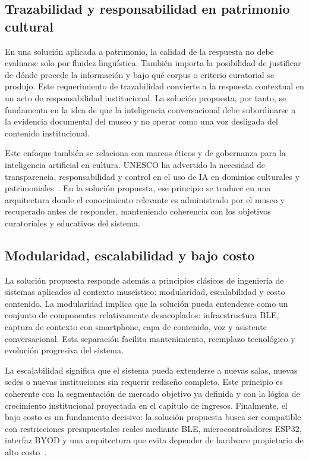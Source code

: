 \subsection{Trazabilidad y responsabilidad en patrimonio cultural}

En una soluci\'on aplicada a patrimonio, la calidad de la respuesta no debe evaluarse solo por fluidez ling\"u\'istica. Tambi\'en importa la posibilidad de justificar de d\'onde procede la informaci\'on y bajo qu\'e corpus o criterio curatorial se produjo. Este requerimiento de trazabilidad convierte a la respuesta contextual en un acto de responsabilidad institucional. La solución propuesta, por tanto, se fundamenta en la idea de que la inteligencia conversacional debe subordinarse a la evidencia documental del museo y no operar como una voz desligada del contenido institucional.

Este enfoque tambi\'en se relaciona con marcos \'eticos y de gobernanza para la inteligencia artificial en cultura. UNESCO ha advertido la necesidad de transparencia, responsabilidad y control en el uso de IA en dominios culturales y patrimoniales~\cite{unescoaiculture2025}. En la solución propuesta, ese principio se traduce en una arquitectura donde el conocimiento relevante es administrado por el museo y recuperado antes de responder, manteniendo coherencia con los objetivos curatoriales y educativos del sistema.

\subsection{Modularidad, escalabilidad y bajo costo}

La solución propuesta responde adem\'as a principios cl\'asicos de ingenier\'ia de sistemas aplicados al contexto muse\'istico: modularidad, escalabilidad y costo contenido. La modularidad implica que la soluci\'on pueda entenderse como un conjunto de componentes relativamente desacoplados: infraestructura BLE, captura de contexto con smartphone, capa de contenido, voz y asistente conversacional. Esta separaci\'on facilita mantenimiento, reemplazo tecnol\'ogico y evoluci\'on progresiva del sistema.

La escalabilidad significa que el sistema pueda extenderse a nuevas salas, nuevas sedes o nuevas instituciones sin requerir redise\~no completo. Este principio es coherente con la segmentaci\'on de mercado objetivo ya definida y con la l\'ogica de crecimiento institucional proyectada en el cap\'itulo de ingresos. Finalmente, el bajo costo es un fundamento decisivo: la solución propuesta busca ser compatible con restricciones presupuestales reales mediante BLE, microcontroladores ESP32, interfaz BYOD y una arquitectura que evita depender de hardware propietario de alto costo~\cite{espressifibeacon,tukker2004pss}.


